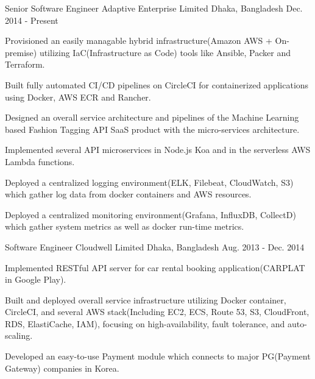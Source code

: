 

\begin{cventries}

  \cventry
    {Senior Software Engineer} %
    {Adaptive Enterprise Limited} %
    {Dhaka, Bangladesh} %
    {Dec. 2014 - Present} %
    {
      \begin{cvitems} %
        \item {Provisioned an easily managable hybrid infrastructure(Amazon AWS + On-premise) utilizing IaC(Infrastructure as Code) tools like Ansible, Packer and Terraform.}
        \item {Built fully automated CI/CD pipelines on CircleCI for containerized applications using Docker, AWS ECR and Rancher.}
        \item {Designed an overall service architecture and pipelines of the Machine Learning based Fashion Tagging API SaaS product with the micro-services architecture.}
        \item {Implemented several API microservices in Node.js Koa and in the serverless AWS Lambda functions.}
        \item {Deployed a centralized logging environment(ELK, Filebeat, CloudWatch, S3) which gather log data from docker containers and AWS resources.}
        \item {Deployed a centralized monitoring environment(Grafana, InfluxDB, CollectD) which gather system metrics as well as docker run-time metrics.}
      \end{cvitems}
    }

  \cventry
    {Software Engineer} %
    {Cloudwell Limited} %
    {Dhaka, Bangladesh} %
    {Aug. 2013 - Dec. 2014} %
    {
      \begin{cvitems} %
        \item {Implemented RESTful API server for car rental booking application(CARPLAT in Google Play).}
        \item {Built and deployed overall service infrastructure utilizing Docker container, CircleCI, and several AWS stack(Including EC2, ECS, Route 53, S3, CloudFront, RDS, ElastiCache, IAM), focusing on high-availability, fault tolerance, and auto-scaling.}
        \item {Developed an easy-to-use Payment module which connects to major PG(Payment Gateway) companies in Korea.}
      \end{cvitems}
    }


\end{cventries}
